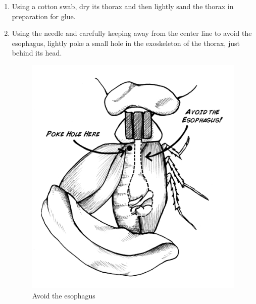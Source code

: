 \begin{enumerate}
\item Using a cotton swab, dry its thorax and then lightly sand the thorax in preparation for glue.
\item Using the needle and carefully keeping away from the center line to avoid the esophagus, lightly poke a small hole in the exoskeleton of the thorax, just behind its head.
\begin{figure}[ht!]
\centering
\includegraphics[scale=0.5]{Surgery Photos/avoidesoph.jpg}
\caption{Avoid the esophagus}
\label{fig:avoidesoph}
\end{figure}


\end{enumerate}
